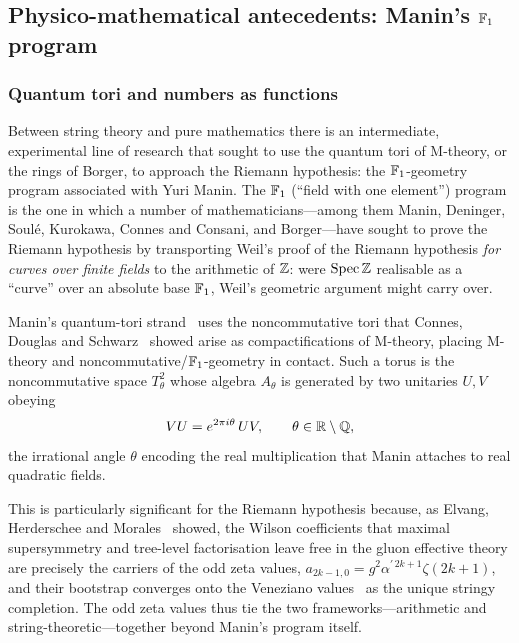 \subsection{Physico-mathematical antecedents: Manin's $\mathbb{F}_1$ program}\label{sec:manin}

\subsubsection{Quantum tori and numbers as functions}
Between string theory and pure mathematics there is an intermediate, experimental line of research that sought to
use the quantum tori of M-theory, or the rings of Borger, to approach the Riemann hypothesis: the $\mathbb{F}_1$-geometry
program associated with Yuri Manin. The $\mathbb{F}_1$ (``field with one element'') program is the one in which a number
of mathematicians---among them Manin, Deninger, Soul\'e, Kurokawa, Connes and Consani, and Borger---have sought to
prove the Riemann hypothesis by transporting Weil's proof of the Riemann hypothesis \emph{for curves over finite
fields} to the arithmetic of $\mathbb{Z}$: were $\operatorname{Spec}\mathbb{Z}$ realisable as a ``curve'' over an absolute base
$\mathbb{F}_1$, Weil's geometric argument might carry over.

Manin's quantum-tori strand~\cite{manin04} uses the noncommutative tori that Connes, Douglas and
Schwarz~\cite{connes98} showed arise as compactifications of M-theory, placing M-theory
and noncommutative/\allowbreak$\mathbb{F}_1$-geometry in contact. Such a torus is the noncommutative space
$T^2_\theta$ whose algebra
$A_\theta$ is generated by two unitaries $U,V$ obeying
\begin{equation}
VU=e^{2\pi i\theta}\,UV,\qquad \theta\in\mathbb{R}\setminus\mathbb{Q},
\end{equation}
the irrational angle $\theta$ encoding the real multiplication that Manin attaches to real quadratic fields.

This is particularly significant for the Riemann hypothesis because, as Elvang, Herderschee and
Morales~\cite{Elvang2026} showed, the Wilson coefficients that maximal supersymmetry and tree-level factorisation
leave free in the gluon effective theory are precisely the carriers of the odd zeta values,
$a_{2k-1,0}=g^{2}\alpha^{\prime\,2k+1}\zeta(2k+1)$, and their bootstrap converges onto the Veneziano
values~\cite{Veneziano} as the unique stringy completion. The odd zeta values thus tie the two
frameworks---arithmetic and string-theoretic---together beyond Manin's program itself.

